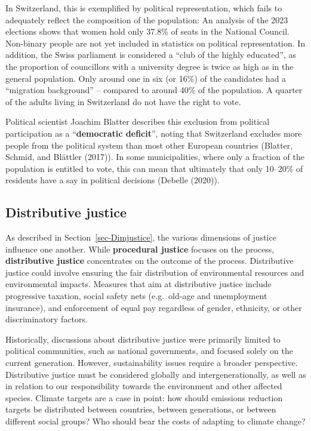 \documentclass[
  a4paper,
  openany]{book}
\begin{document}
In Switzerland, this is exemplified by political representation, which
fails to adequately reflect the composition of the population: An
analysis of the 2023 elections shows that women hold only 37.8\% of
seats in the National Council. Non-binary people are not yet included in
statistics on political representation. In addition, the Swiss
parliament is considered a ``club of the highly educated'', as the
proportion of councillors with a university degree is twice as high as
in the general population. Only around one in six (or 16\%) of the
candidates had a ``migration background'' -- compared to around 40\% of
the population. A quarter of the adults living in Switzerland do not
have the right to vote.

Political scientist Joachim Blatter describes this exclusion from
political participation as a ``\textbf{democratic deficit}'', noting
that Switzerland excludes more people from the political system than
most other European countries (Blatter, Schmid, and Blättler (2017)). In
some municipalities, where only a fraction of the population is entitled
to vote, this can mean that ultimately that only 10--20\% of residents
have a say in political decisions (Debelle (2020)).

\subsection{Distributive justice}\label{distributive-justice}

As described in Section~\ref{sec-Dimjustice}, the various dimensions of
justice influence one another. While \textbf{procedural justice} focuses
on the process, \textbf{distributive justice} concentrates on the
outcome of the process. Distributive justice could involve ensuring the
fair distribution of environmental resources and environmental impacts.
Measures that aim at distributive justice include progressive taxation,
social safety nets (e.g.~old-age and unemployment insurance), and
enforcement of equal pay regardless of gender, ethnicity, or other
discriminatory factors.

Historically, discussions about distributive justice were primarily
limited to political communities, such as national governments, and
focused solely on the current generation. However, sustainability issues
require a broader perspective. Distributive justice must be considered
globally and intergenerationally, as well as in relation to our
responsibility towards the environment and other affected species.
Climate targets are a case in point: how should emissions reduction
targets be distributed between countries, between generations, or
between different social groups? Who should bear the costs of adapting
to climate change?
\end{document}
